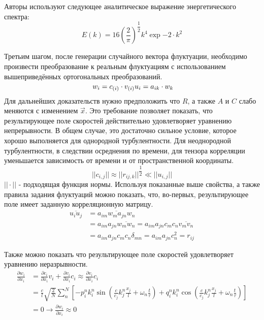 Авторы используют следующее аналитическое выражение энергетического спектра:
\begin{equation}
    \label{eq:spectral_equation9}
    E(k) = 16 (\frac{2}{\pi})^{\dfrac{1}{2}} k^4 \exp{-2 \cdot k^2}
\end{equation}

Третьим шагом, после генерации случайного вектора флуктуации, необходимо произвести преобразование к реальным флуктуациям с использованием вышеприведённых ортогональных преобразований.
\begin{equation}
    \label{eq:spectral_equation10}\
    w_i = c_{\left( i \right)} \cdot v_{\left( i \right)} \\
    u_i = a_{ik} \cdot w_k
\end{equation}
Для дальнейших доказательств нужно предположить что $R$, а также $A$ и $C$ слабо меняются с изменением $\vec x$. Это требование позволяет показать, что результирующее поле скоростей действительно удовлетворяет уравнению непрерывности. В общем случае, это достаточно сильное условие, которое хорошо выполняется для однородной турбулентности. Для неоднородной турбулентности, в следствии осреднения по времени, для тензора корреляции уменьшается зависимость от времени и от пространственной координаты. 
\begin{equation}
    \label{eq:spectral_equation11}
    ||c_{i, j}|| \approx || r_{ij, k} || ^ {\dfrac{1}{2}} \ll || u_{i, j} ||
\end{equation}
$||\cdot||$ - подходящая функция нормы.
Используя показанные выше свойства, а также правила задания флуктуаций можно показать, что, во-первых, результирующее поле имеет заданную корреляционную матрицу.
\begin{align}
    \label{eq:spectral_equation12}
    \overline{u_i u_j} & = \overline{a_{im} w_m a_{jn} w_n} \nonumber \\
    & = a_{im} a_{jn} \overline{w_m w_n} = a_{im} a_{jn} c_m c_n \overline{v_m v_n} \nonumber \\
    & = a_{im} a_{jn} c_m c_n \delta_{mn} = a_{im} a_{jn} c_n^2 = r_{ij}
\end{align}

Также можно показать что результирующее поле скоростей удовлетворяет уравнению неразрывности. 
\begin{align}
    \label{eq:spectral_equation13}
    \frac{\partial w_i}{\partial x_i} & = \frac{\partial c_i}{\partial x_i} v_i + \frac{\partial v_i}{ \partial x_i} c_i \approx \frac{\partial v_i}{ \partial x_i} c_i \nonumber \\ 
    & = \frac{c}{l} \sqrt{\frac{2}{N}} \sum_n^N \left[ -p_i^n k_i^n \sin{(\frac{c}{c_j} k_j^n \frac{x_j}{l} + \omega_n \frac{t}{\tau})} + q_i^n k_i^n \cos{(\frac{c}{c_j} k_j^n \frac{x_j}{l} + \omega_n \frac{t}{\tau})} \right] \nonumber \\ 
    & = 0 \rightarrow \frac{\partial w_i}{\partial x_i} \approx 0
\end{align}

